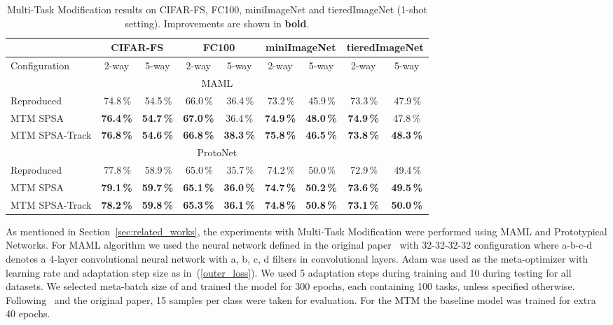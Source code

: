 \documentclass{article}
\begin{document}
\begin{table*}[th]
	\caption{Multi-Task Modification results on CIFAR-FS, FC100, miniImageNet and tieredImageNet (1-shot setting). Improvements are shown in {\bf bold}.}
	\label{table:all_benchmarks}
	\begin{center}
		\begin{tabular}{|l|c|c|c|c|c|c|c|c|}
	    	\hline
		     & \multicolumn{2}{|c|}{CIFAR-FS} & \multicolumn{2}{c|}{FC100} & \multicolumn{2}{|c|}{miniImageNet} & \multicolumn{2}{c|}{tieredImageNet}\\
			\hline
			Configuration & 2-way & 5-way & 2-way & 5-way & 2-way & 5-way & 2-way & 5-way \\
			\hline
			\multicolumn{9}{|c|}{MAML} \\
			\hline
			Reproduced     & \,74.8\,\%    & \,54.5\,\%    & \,66.0\,\%    & \,36.4\,\%    & \,73.2\,\%    & \,45.9\,\%    & \,73.3\,\%    & \,47.9\,\%   \\
			MTM SPSA       & \bf{76.4\,\%} & \bf{54.7\,\%} & \bf{67.0}\,\% & 36.4\,\%      & \bf{74.9\,\%} & \bf{48.0\,\%} & \bf{74.9}\,\% & 47.8\,\% \\
			MTM SPSA-Track & \bf{76.8\,\%} & \bf{54.6\,\%} & \bf{66.8}\,\% & \bf{38.3\,\%} & \bf{75.8\,\%} & \bf{46.5\,\%} & \bf{73.8}\,\% & \bf{48.3\,\%} \\
			\hline
			\multicolumn{9}{|c|}{ProtoNet} \\
			\hline
			Reproduced     & \,77.8\,\%    & \,58.9\,\%    & \,65.0\,\%    & \,35.7\,\%    & \,74.2\,\%    & \,50.0\,\%    & \,72.9\,\%    & \,49.4\,\%   \\
			MTM SPSA       & \bf{79.1\,\%} & \bf{59.7\,\%} & \bf{65.1}\,\% & \bf{36.0\,\%} & \bf{74.7\,\%} & \bf{50.2\,\%} & \bf{73.6}\,\% & \bf{49.5\,\%} \\
			MTM SPSA-Track & \bf{78.2\,\%} & \bf{59.8\,\%} & \bf{65.3}\,\% & \bf{36.1\,\%} & \bf{74.8\,\%} & \bf{50.8\,\%} & \bf{73.1}\,\% & \bf{50.0\,\%} \\
			\hline
		\end{tabular}
	\end{center}
\end{table*}







As mentioned in Section~\ref{sec:related_works}, the experiments with Multi-Task Modification were performed using MAML and Prototypical Networks. For MAML algorithm we used the neural network  defined in the original paper~\cite{finn2017model} with 32-32-32-32 configuration where a-b-c-d denotes a 4-layer convolutional neural network with a, b, c, d filters in convolutional layers. Adam was used as the meta-optimizer with learning rate  and adaptation step size  as in~(\ref{outer_loss}). We used 5 adaptation steps during training and 10 during testing for all datasets. We selected meta-batch size of  and trained the model for 300 epochs, each containing 100 tasks, unless specified otherwise. Following~\cite{Ravi2017OptimizationAA} and the original paper, 15 samples per class were taken for evaluation. For the MTM the baseline model was trained for extra 40 epochs.
\end{document}

